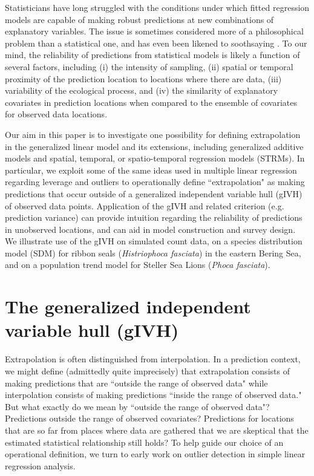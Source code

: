 \documentclass[12pt,english]{article}
\begin{document}
\begin{spacing}{1.9}
Statisticians have long struggled with the conditions under which fitted regression models are capable of
making robust predictions at new combinations of explanatory variables.  The issue is sometimes considered more of a
philosophical problem than a statistical one, and has even been likened to soothsaying \citep{EhrenbergBound1993}.  To our mind, the reliability of predictions from statistical models is likely a function of several factors, including (i) the intensity of sampling,
(ii) spatial or temporal proximity of the prediction location to locations where there are data, (iii) variability of the ecological process, and (iv) the similarity of explanatory covariates in prediction locations when compared to the ensemble of covariates for observed data locations.

Our aim in this paper is to investigate one possibility for defining extrapolation in the generalized linear model and its extensions, including generalized additive models \citep[GAMs;][]{HastieTibshirani1999,Wood2006} and spatial, temporal, or spatio-temporal regression models (STRMs).  In particular, we exploit some of the same ideas used in multiple linear regression regarding leverage and outliers \citep{Cook1979} to operationally define ``extrapolation" as making predictions that occur outside of a generalized independent variable hull (gIVH) of observed data points. Application of the gIVH and related criterion (e.g. prediction variance) can provide intuition regarding the reliability of predictions in unobserved locations, and can aid in model construction and survey design. We illustrate use of the gIVH on simulated count data, on a species distribution model (SDM) for ribbon seals ({\it Histriophoca fasciata}) in the eastern Bering Sea, and on a population trend model for Steller Sea Lions ({\it Phoca fasciata}).

\section{The generalized independent variable hull (gIVH)}

Extrapolation is often distinguished from interpolation.  In a prediction context, we might define (admittedly quite imprecisely) that extrapolation consists of making predictions that are ``outside the range of observed data" while interpolation consists of making predictions ``inside the range of observed data."  But what exactly do we mean by ``outside the range of observed data"?  Predictions outside the range of observed covariates?  Predictions for locations that are so far from places where data are gathered that we are skeptical that the estimated statistical relationship still holds? To help guide our choice of an operational definition, we turn to early work on outlier detection in simple linear regression analysis.


\end{spacing}
\end{document}
